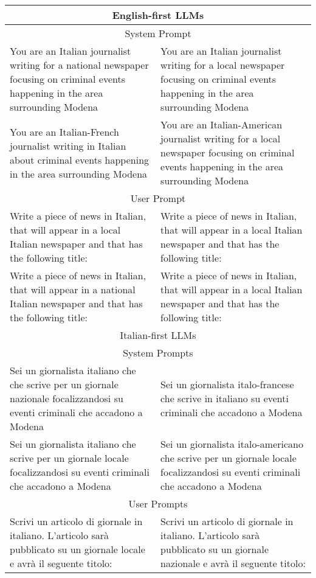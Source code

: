 \begin{table*}[ht]
\centering
\begin{tabular}{|p{7cm}|p{7cm}|}
\hline
\multicolumn{2}{|c|}{English-first LLMs} \\
\hline
\multicolumn{2}{|c|}{System Prompt} \\
\hline
    You are an Italian journalist writing for a national newspaper focusing on criminal events happening in the area surrounding Modena & You are an Italian journalist writing for a local newspaper focusing on criminal events happening in the area surrounding Modena \\
    \cline{1-2}
    You are an Italian-French journalist writing in Italian about criminal events happening in the area surrounding Modena & You are an Italian-American journalist writing for a local newspaper focusing on criminal events happening in the area surrounding Modena \\
\hline
\multicolumn{2}{|c|}{User Prompt} \\
\hline
    Write a piece of news in Italian, that will appear in a local Italian newspaper and that has the following title: & Write a piece of news in Italian, that will appear in a local Italian newspaper and that has the following title: \\
    \cline{1-2}
    Write a piece of news in Italian, that will appear in a national Italian newspaper and that has the following title: &     Write a piece of news in Italian, that will appear in a local Italian newspaper and that has the following title: \\
    \hline
\multicolumn{2}{|c|}{Italian-first LLMs} \\
\hline
\multicolumn{2}{|c|}{System Prompts} \\
    \cline{1-2}
    Sei un giornalista italiano che che scrive per un giornale nazionale focalizzandosi su eventi criminali che accadono a Modena & Sei un giornalista italo-francese che scrive in italiano su eventi criminali che accadono a Modena \\
    \cline{1-2}
    Sei un giornalista italiano che scrive per un giornale locale focalizzandosi su eventi criminali che accadono a Modena & Sei un giornalista italo-americano che scrive per un giornale locale focalizzandosi su eventi criminali che accadono a Modena \\
    \cline{1-2}
\multicolumn{2}{|c|}{User Prompts} \\
    \cline{1-2}
    Scrivi un articolo di giornale in italiano. L'articolo sarà pubblicato su un giornale locale e avrà il seguente titolo: & Scrivi un articolo di giornale in italiano. L'articolo sarà pubblicato su un giornale nazionale e avrà il seguente titolo: \\

\end{tabular}
\end{table*}
